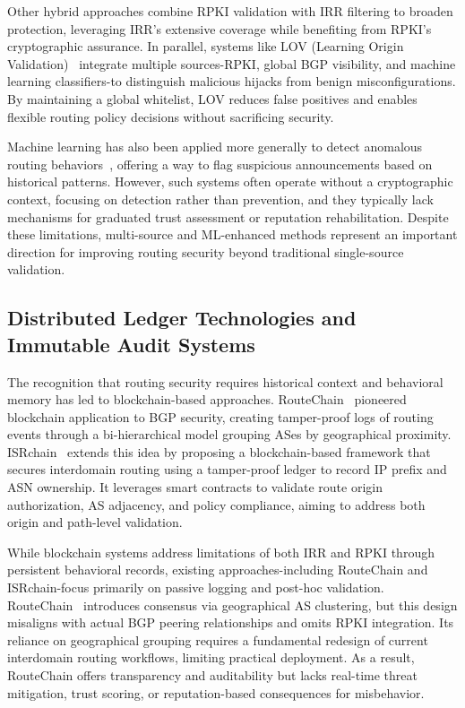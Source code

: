 \documentclass[conference]{IEEEtran}
\begin{document}
Other hybrid approaches combine RPKI validation with IRR filtering to broaden protection, leveraging IRR's extensive coverage while benefiting from RPKI's cryptographic assurance. In parallel, systems like LOV (Learning Origin Validation)~\cite{schulmann2025lov} integrate multiple sources-RPKI, global BGP visibility, and machine learning classifiers-to distinguish malicious hijacks from benign misconfigurations. By maintaining a global whitelist, LOV reduces false positives and enables flexible routing policy decisions without sacrificing security.

Machine learning has also been applied more generally to detect anomalous routing behaviors~\cite{chen2024beam}, offering a way to flag suspicious announcements based on historical patterns. However, such systems often operate without a cryptographic context, focusing on detection rather than prevention, and they typically lack mechanisms for graduated trust assessment or reputation rehabilitation. Despite these limitations, multi-source and ML-enhanced methods represent an important direction for improving routing security beyond traditional single-source validation.

\subsection{Distributed Ledger Technologies and Immutable Audit Systems}

The recognition that routing security requires historical context and behavioral memory has led to blockchain-based approaches. RouteChain~\cite{saad2022routechain} pioneered blockchain application to BGP security, creating tamper-proof logs of routing events through a bi-hierarchical model grouping ASes by geographical proximity. ISRchain~\cite{chen2020isrchain} extends this idea by proposing a blockchain-based framework that secures interdomain routing using a tamper-proof ledger to record IP prefix and ASN ownership. It leverages smart contracts to validate route origin authorization, AS adjacency, and policy compliance, aiming to address both origin and path-level validation.

While blockchain systems address limitations of both IRR and RPKI through persistent behavioral records, existing approaches-including RouteChain and ISRchain-focus primarily on passive logging and post-hoc validation. RouteChain~\cite{saad2022routechain} introduces consensus via geographical AS clustering, but this design misaligns with actual BGP peering relationships and omits RPKI integration. Its reliance on geographical grouping requires a fundamental redesign of current interdomain routing workflows, limiting practical deployment. As a result, RouteChain offers transparency and auditability but lacks real-time threat mitigation, trust scoring, or reputation-based consequences for misbehavior.
\end{document}
